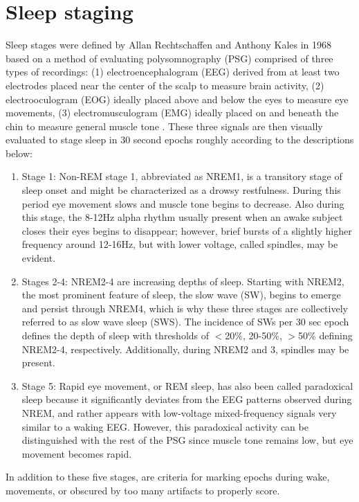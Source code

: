 \section*{Sleep staging}
Sleep stages were defined by Allan Rechtschaffen and Anthony Kales in 1968 based on a method of evaluating polysomnography (PSG) comprised of three types of recordings: (1) electroencephalogram (EEG) derived from at least two electrodes placed near the center of the scalp to measure brain activity, (2) electrooculogram (EOG) ideally placed above and below the eyes to measure eye movements, (3) electromusculogram (EMG) ideally placed on and beneath the chin to measure general muscle tone \citep{Kales1968}. These three signals are then visually evaluated to stage sleep in 30 second epochs roughly according to the descriptions below:
\begin{enumerate}
\item[] Stage 1: Non-REM stage 1, abbreviated as NREM1, is a transitory stage of sleep onset and might be characterized as a drowsy restfulness. During this period eye movement slows and muscle tone begins to decrease. Also during this stage, the 8-12Hz alpha rhythm usually present when an awake subject closes their eyes begins to disappear; however, brief bursts of a slightly higher frequency around 12-16Hz, but with lower voltage, called spindles, may be evident.
\item[] Stages 2-4: NREM2-4 are increasing depths of sleep. Starting with NREM2, the most prominent feature of sleep, the slow wave (SW), begins to emerge and persist through NREM4, which is why these three stages are collectively referred to as slow wave sleep (SWS). The incidence of SWs per 30 sec epoch defines the depth of sleep with thresholds of $<$20\%, 20-50\%, $>$50\% defining NREM2-4, respectively. Additionally, during NREM2 and 3, spindles may be present.
\item[] Stage 5: Rapid eye movement, or REM sleep, has also been called paradoxical sleep because it significantly deviates from the EEG patterns observed during NREM, and rather appears with low-voltage mixed-frequency signals very similar to a waking EEG. However, this paradoxical activity can be distinguished with the rest of the PSG since muscle tone remains low, but eye movement becomes rapid.
\end{enumerate}
In addition to these five stages, are criteria for marking epochs during wake, movements, or obscured by too many artifacts to properly score.

